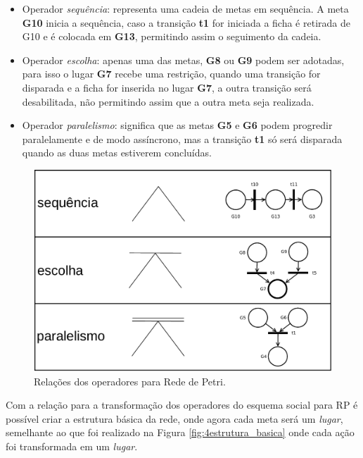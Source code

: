 \begin{itemize}

\item Operador \textit{sequência}: representa uma cadeia de metas em sequência. A meta \textbf{G10} inicia a sequência, caso a transição \textbf{t1} for iniciada a ficha é retirada de G10 e é colocada em \textbf{G13}, permitindo assim o seguimento da cadeia. 

\item Operador \textit{escolha}: apenas uma das metas, \textbf{G8} ou \textbf{G9} podem ser adotadas, para isso o lugar \textbf{G7} recebe uma restrição, quando uma transição for disparada e a ficha for inserida no lugar \textbf{G7}, a outra transição será desabilitada, não permitindo assim que a outra meta seja realizada. 

\item Operador \textit{paralelismo}: significa que as metas \textbf{G5} e \textbf{G6} podem progredir paralelamente e de modo assíncrono, mas a transição \textbf{t1} só será disparada quando as duas metas estiverem concluídas.

\end{itemize}

\begin{figure}[ht]
\centering
\includegraphics[scale=0.4]{imagens/4-relacao-moise-rp.pdf}
\caption{Relações dos operadores para Rede de Petri.}
\label{fig:moise_rp}
\end{figure}

Com a relação para a transformação dos operadores do esquema social para RP é possível criar a estrutura básica da rede, onde agora cada meta será um \textit{lugar}, semelhante ao que foi realizado na Figura \ref{fig:4estrutura_basica} onde cada ação foi transformada em um \textit{lugar}.  

